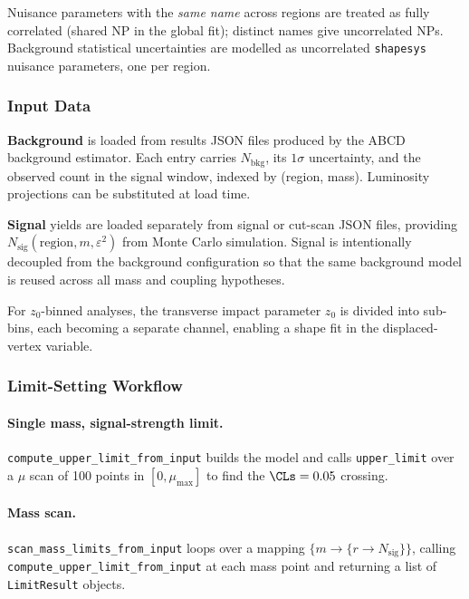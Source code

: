 Nuisance parameters with the \emph{same name} across regions are treated as
fully correlated (shared NP in the global fit); distinct names give
uncorrelated NPs.  Background statistical uncertainties are modelled as
uncorrelated \texttt{shapesys} nuisance parameters, one per region.

\subsubsection{Input Data}

\textbf{Background} is loaded from results JSON files produced by the ABCD
background estimator.  Each entry carries $N_\text{bkg}$, its $1\sigma$
uncertainty, and the observed count in the signal window, indexed by (region,
mass).  Luminosity projections can be substituted at load time.

\textbf{Signal} yields are loaded separately from signal or cut-scan JSON
files, providing $N_\text{sig}(\text{region}, m, \varepsilon^2)$ from Monte
Carlo simulation.  Signal is intentionally decoupled from the background
configuration so that the same background model is reused across all mass and
coupling hypotheses.

For $z_0$-binned analyses, the transverse impact parameter $z_0$ is divided
into sub-bins, each becoming a separate \pyhf{} channel, enabling a shape fit
in the displaced-vertex variable.

\subsubsection{Limit-Setting Workflow}

\paragraph{Single mass, signal-strength limit.}
\texttt{compute\_upper\_limit\_from\_input} builds the \pyhf{} model and
calls \texttt{upper\_limit} over a $\mu$ scan of 100 points in
$[0, \mu_\text{max}]$ to find the $\CLs = 0.05$ crossing.

\paragraph{Mass scan.}
\texttt{scan\_mass\_limits\_from\_input} loops over a mapping
$\{m \to \{r \to N_\text{sig}\}\}$, calling
\texttt{compute\_upper\_limit\_from\_input} at each mass point and returning
a list of \texttt{LimitResult} objects.

